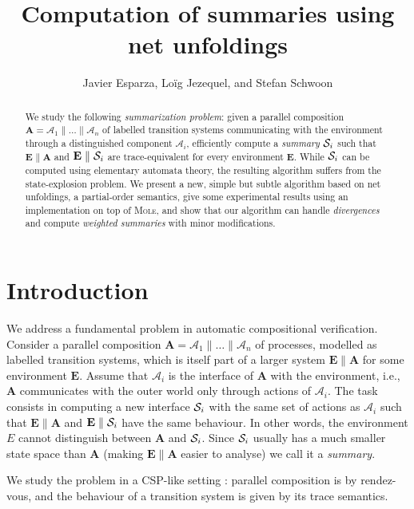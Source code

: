 \documentclass{llncs}
\title{Computation of summaries using net unfoldings}
\author{Javier Esparza\inst{1}, Lo\"ig Jezequel\inst{2}, and Stefan Schwoon\inst{3}}
\institute{Institut f\"ur Informatik, Technische Universit\"at M\"unchen, Germany
\and
ENS Cachan Bretagne, Rennes, France
\and
LSV, ENS Cachan \& CNRS, INRIA Saclay, France}
\def\A{\mathcal{A}}
\def\prod{\mathbf{A}}
\def\S{\mathcal{S}}
\renewcommand{\S}{{\cal S}}
\begin{document}
\maketitle

\begin{abstract}
We study the following {\em summarization problem}: given a parallel
composition $\prod = \A_1 \parallel \ldots \parallel \A_n$ of labelled transition systems
communicating with the environment through a distinguished component $\A_i$, 
efficiently compute a {\em summary } $\S_i$ such that $\mathbf{E} \parallel \prod$ and $\mathbf{E} \parallel \S_i$ are trace-equivalent for every environment $\mathbf{E}$. While $\S_i$ 
can be computed using elementary automata theory, the resulting algorithm suffers from
the state-explosion problem. We present a new, simple but subtle algorithm based on net unfoldings, 
a partial-order semantics, give some experimental results using an implementation on top of \textsc{Mole}, and show that our algorithm can handle {\em divergences} and compute {\em weighted summaries} with minor modifications.


\end{abstract}

\section{Introduction}

We address a fundamental problem in automatic compositional verification. Consider a 
parallel composition $\prod = \A_1 \parallel \ldots \parallel \A_n$ of processes,
modelled as labelled transition systems, which is itself part of a larger system $\mathbf{E} \parallel \prod$ for some environment $\mathbf{E}$.
Assume that $\A_i$ is the interface of $\prod$ with the environment, i.e., 
$\prod$ communicates with the outer world only through actions 
of $\A_i$. The task consists in computing a new interface 
$\S_i$ with the same set
of actions as $\A_i$ such that $\mathbf{E} \parallel \prod$ and $\mathbf{E} \parallel \S_i$ 
have the same behaviour. In other words, the environment $E$ cannot distinguish between 
$\prod$ and $\S_i$. Since
$\S_i$ usually has a much smaller state space than $\prod$ (making
$\mathbf{E} \parallel \prod$ easier to analyse) we call it a {\em summary}.

We study the problem in a CSP-like setting \cite{Hoare85}:
parallel composition is by rendez-vous, and the behaviour of a transition
system is given by its trace semantics. 
\end{document}

